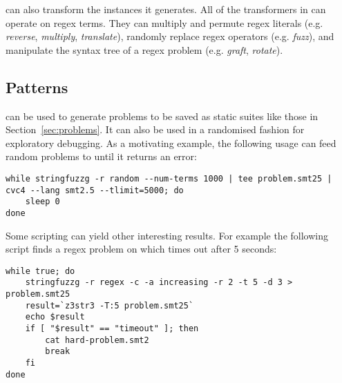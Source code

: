         \fuzzer{} can also transform the instances it generates. All of the transformers in \transformer{} can operate on regex terms. They can multiply and permute regex literals (e.g. \textit{reverse}, \textit{multiply}, \textit{translate}), randomly replace regex operators (e.g. \textit{fuzz}), and manipulate the syntax tree of a regex problem (e.g. \textit{graft}, \textit{rotate}).

    \subsection{Patterns}

        \fuzzer{} can be used to generate problems to be saved as static suites like those in Section~\ref{sec:problems}. It can also be used in a randomised fashion for exploratory debugging. As a motivating example, the following usage can feed random problems to \cvc{} until it returns an error:

        {\scriptsize\begin{verbatim}while stringfuzzg -r random --num-terms 1000 | tee problem.smt25 | cvc4 --lang smt2.5 --tlimit=5000; do
    sleep 0
done\end{verbatim}}

        Some \unix{} scripting can yield other interesting results. For example the following script finds a regex problem on which \us{} times out after 5 seconds:

        {\scriptsize\begin{verbatim}while true; do
    stringfuzzg -r regex -c -a increasing -r 2 -t 5 -d 3 > problem.smt25
    result=`z3str3 -T:5 problem.smt25`
    echo $result
    if [ "$result" == "timeout" ]; then
        cat hard-problem.smt2
        break
    fi
done\end{verbatim}}
